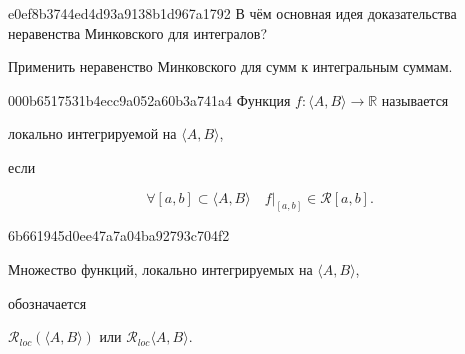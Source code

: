 
\begin{note}{e0ef8b3744ed4d93a9138b1d967a1792}
    В чём основная идея доказательства неравенства Минковского для интегралов?

    \begin{cloze}{1}
        Применить неравенство Минковского для сумм к интегральным суммам.
    \end{cloze}
\end{note}

\begin{note}{000b6517531b4ecc9a052a60b3a741a4}
    Функция \({ f : \langle A, B \rangle \to \mathbb R }\) называется \begin{icloze}{2}локально интегрируемой на \({ \langle A, B \rangle }\),\end{icloze} если
    \begin{icloze}{1}
        \[
            \forall [a, b] \subset \langle A, B \rangle \quad f|_{[a, b]} \in \mathcal R[a, b].
        \]
    \end{icloze}
\end{note}

\begin{note}{6b661945d0ee47a7a04ba92793c704f2}
    \begin{icloze}{1}Множество функций, локально интегрируемых на \({ \langle A, B \rangle }\),\end{icloze} обозначается \begin{icloze}{2}\({ \mathcal R_{loc}(\langle A, B \rangle) }\) или \({ \mathcal R_{loc}\langle A, B \rangle }\).\end{icloze}
\end{note}

